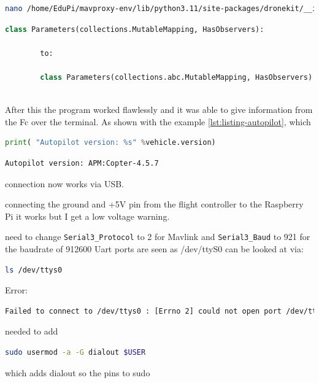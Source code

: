 \documentclass{article}
\begin{document}
	\begin{lstlisting}[caption= accessing source code, language=bash, label=sourcecode]
		nano /home/EduPi/mavproxy-env/lib/python3.11/site-packages/dronekit/__init__.py
	\end{lstlisting}
	
	\begin{lstlisting}[caption= changed line, language=python, label=changed line]
		class Parameters(collections.MutableMapping, HasObservers):
		
		to:
		
		class Parameters(collections.abc.MutableMapping, HasObservers):
		
	\end{lstlisting}
	
	After this the program worked flawlessly and it was able to give information from the \gls{Fc} over the terminal. As shown with the example \ref{lst:listing-autopilot}, which 
	
	\begin{lstlisting}[language=python, caption={Python Dronekittest 2}, label=lst:listing-autopilot]
		print( "Autopilot version: %s" %vehicle.version)
	\end{lstlisting}
	\begin{lstlisting}[caption= output from \ref{lst:listing-autopilot}, language=bash]
		Autopilot version: APM:Copter-4.5.7
	\end{lstlisting}
	connection now works via USB.
	
	connecting the ground and +5V pin from the flight controller to the Raspberry Pi it works but I get a low voltage warning.
	
	need to change \lstinline|Serial3_Protocol| to 2 for Mavlink
	and \lstinline|Serial3_Baud| to 921 for the baudrate of 912600
	Uart ports are seen as /dev/ttyS0
	can be looked at via:
	\begin{lstlisting}[language=bash]
		ls /dev/ttys0
	\end{lstlisting}
	
	Error: 
	\begin{lstlisting}[language=bash]
		Failed to connect to /dev/ttys0 : [Errno 2] could not open port /dev/ttys0: [Errno 2] No such file or directory: '/dev/ttys0'
	\end{lstlisting}
	
	needed to add 
	\begin{lstlisting}[language=bash]
		sudo usermod -a -G dialout $USER
	\end{lstlisting}
	which adds dialout so the pins to sudo
	
\end{document}
